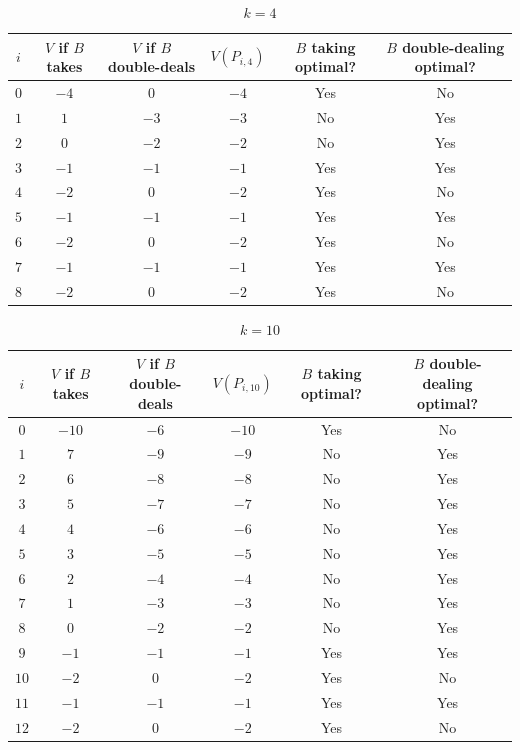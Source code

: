 \documentclass[a4paper,twocolumn]{article}
\begin{document}
\begin{table}[p]
  \centering
  \begin{tabular}{c c c c c c}
    $i$ & $V$ if $B$ takes & $V$ if $B$ double-deals & $V(P_{i,4})$ & $B$ taking optimal? & $B$ double-dealing optimal? \\
    \hline
    $0$ & $-4$ & $0$ & $-4$ & Yes & No \\
    $1$ & $1$ & $-3$ & $-3$ & No & Yes \\
    $2$ & $0$ & $-2$ & $-2$ & No & Yes \\
    $3$ & $-1$ & $-1$ & $-1$ & Yes & Yes \\
    $4$ & $-2$ & $0$ & $-2$ & Yes & No \\
    $5$ & $-1$ & $-1$ & $-1$ & Yes & Yes \\
    $6$ & $-2$ & $0$ & $-2$ & Yes & No \\
    $7$ & $-1$ & $-1$ & $-1$ & Yes & Yes \\
    $8$ & $-2$ & $0$ & $-2$ & Yes & No
  \end{tabular}
  \caption{$k=4$}
  \label{vpik4}
\end{table}

\begin{table}[p]
  \centering
  \begin{tabular}{c c c c c c}
    $i$ & $V$ if $B$ takes & $V$ if $B$ double-deals & $V(P_{i,10})$ & $B$ taking optimal? & $B$ double-dealing optimal? \\
    \hline
    $0$ & $-10$ & $-6$ & $-10$ & Yes & No \\
    $1$ & $7$ & $-9$ & $-9$ & No & Yes \\
    $2$ & $6$ & $-8$ & $-8$ & No & Yes \\
    $3$ & $5$ & $-7$ & $-7$ & No & Yes \\
    $4$ & $4$ & $-6$ & $-6$ & No & Yes \\
    $5$ & $3$ & $-5$ & $-5$ & No & Yes \\
    $6$ & $2$ & $-4$ & $-4$ & No & Yes \\
    $7$ & $1$ & $-3$ & $-3$ & No & Yes \\
    $8$ & $0$ & $-2$ & $-2$ & No & Yes \\
    $9$ & $-1$ & $-1$ & $-1$ & Yes & Yes \\
    $10$ & $-2$ & $0$ & $-2$ & Yes & No \\
    $11$ & $-1$ & $-1$ & $-1$ & Yes & Yes \\
    $12$ & $-2$ & $0$ & $-2$ & Yes & No
  \end{tabular}
  \caption{$k=10$}
  \label{vpik10}
\end{table}
\end{document}

